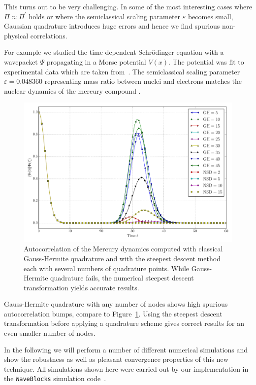 \documentclass[a4paper,10pt]{article}
\begin{document}
This turns out to be very challenging. In some of the most interesting cases where
$\Pi \approx \Pi^{\prime}$ holds or where the semiclassical scaling parameter $\varepsilon$
becomes small, Gaussian quadrature introduces huge errors and hence we find spurious
non-physical correlations.

For example we studied the time-dependent Schr\"odinger equation with a wave\-packet $\Psi$
propagating in a Morse potential $V(x)$. The potential was fit to experimental data which
are taken from~\cite{SIZ_hg2}. The semiclassical scaling parameter $\varepsilon = 0.048360$
representing mass ratio between nuclei and electrons matches the nuclear dynamics of the
mercury compound .

\begin{figure}
  \centering
  \includegraphics[width=0.8\linewidth]{./fig/ac_mercurial_morse.pdf}
  \caption{Autocorrelation of the Mercury dynamics computed with classical
  Gauss-Hermite quadrature and with the steepest descent method each with several
  numbers of quadrature points. While Gauss-Hermite quadrature fails,
  the numerical steepest descent transformation yields accurate results.}
  \label{fig:ac_mercurial_morse}
\end{figure}

Gauss-Hermite quadrature with any number of nodes shows high spurious autocorrelation bumps,
compare to Figure~\ref{fig:ac_mercurial_morse}. Using the steepest descent transformation
before applying a quadrature scheme gives correct results for an even smaller number of nodes.

In the following we will perform a number of different numerical simulations and show
the robustness as well as pleasant convergence properties of this new technique.
All simulations shown here were carried out by our implementation in the \texttt{WaveBlocks}
simulation code~\cite{waveblocksnd}.
\end{document}
